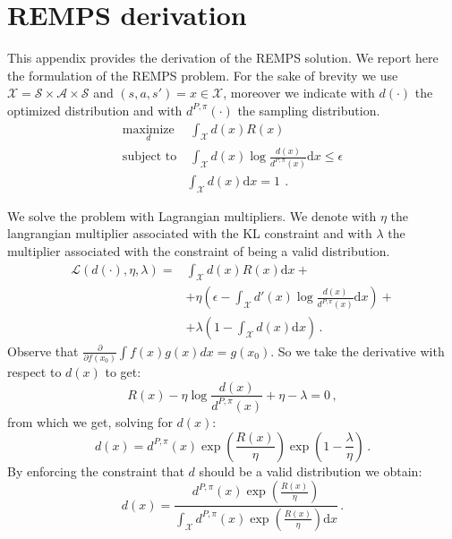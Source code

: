 \chapter{REMPS derivation}
\label{sec:remps_deriv}
\thispagestyle{empty}

\noindent This appendix provides the derivation of the REMPS solution.
We report here the formulation of the REMPS problem. For the sake of brevity we use $\mathcal{X} = \mathcal{S} \times \mathcal{A} \times \mathcal{S}$ and $(s,a,s') = x \in \mathcal{X}$, moreover we indicate with $d(\cdot)$ the optimized distribution and with $d^{P,\pi}(\cdot)$ the sampling distribution.
\begin{align}
	\underset{d}{\text{maximize}} & \; \int_\mathcal{X}d(x)R(x) \\
	\text{subject to} &  \; \int_\mathcal{X}d(x) \log \frac{d(x)}{d^{P,\pi}(x)} \mathrm{d}x \leq \epsilon \\
	& \int_\mathcal{X} d(x) \mathrm{d}x = 1 \ \, .
\end{align} 

We solve the problem with Lagrangian multipliers. We denote with $\eta$ the langrangian multiplier associated with the KL constraint and with $\lambda$ the multiplier associated with the constraint of being a valid distribution.
\begin{align}
	\mathcal{L}(d(\cdot), \eta, \lambda) = &\int_\mathcal{X} d(x)R(x) \mathrm{d}x +\\ &+ \eta \left( \epsilon - \int_\mathcal{X} d'(x) \log \frac{d(x)}{d^{P,\pi}(x)} \mathrm{d}x \right) +\\ &+ \lambda \left(1 - \int_\mathcal{X} d(x) \mathrm{d}x \right) \, .
	\label{eq:lagrangian}
\end{align}
Observe that $\frac{\partial}{\partial f(x_0)} \int f(x) g(x) dx = g(x_0)$. So we take the derivative with respect to $d(x)$ to get:
\begin{equation}
	R(x) - \eta \log \frac{d(x)}{d^{P,\pi}(x)} + \eta - \lambda = 0 \, ,
\end{equation}
from which we get, solving for $d(x)$:
\begin{equation}
	d(x) = d^{P,\pi}(x) \exp \left(\frac{R(x)}{\eta} \right) \exp \left( 1 - \frac{\lambda}{\eta} \right) \, .
	\label{eq:remps-pol}
\end{equation}
By enforcing the constraint that $d$ should be a valid distribution we obtain:
\begin{equation}
	d(x) = \frac{d^{P,\pi}(x) \exp \left(\frac{R(x)}{\eta} \right)}{\int_\mathcal{X} d^{P,\pi}(x) \exp \left( \frac{R(x)}{\eta} \right) \mathrm{d}x} \, .
\end{equation}

